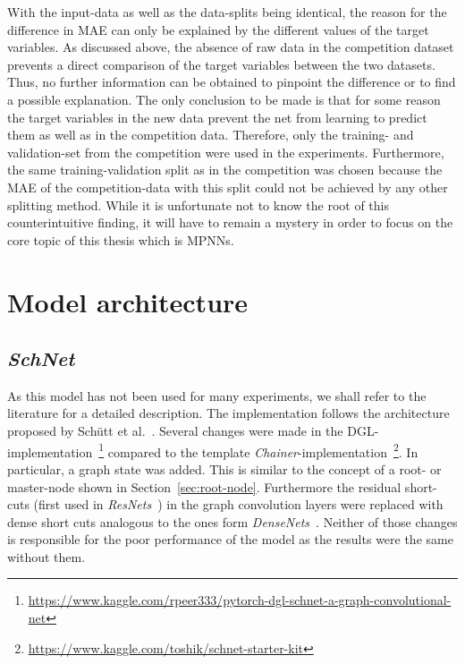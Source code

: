 With the input-data as well as the data-splits being identical, the reason for the difference in MAE can only be explained by the different values of the target variables. As discussed above, the absence of raw data in the competition dataset prevents a direct comparison of the target variables between the two datasets. Thus, no further information can be obtained to pinpoint the difference or to find a possible explanation. The only conclusion to be made is that for some reason the target variables in the new data prevent the net from learning to predict them as well as in the competition data. Therefore, only the training- and validation-set from the competition were used in the experiments. Furthermore, the same training-validation split as in the competition was chosen because the MAE of the competition-data with this split could not be achieved by any other splitting method. While it is unfortunate not to know the root of this counterintuitive finding, it will have to remain a mystery in order to focus on the core topic of this thesis which is MPNNs. 


\section{Model architecture}
\label{sec:architecture}

\subsection{\textit{SchNet}}
\label{sec:schnet-architecture}

As this model has not been used for many experiments, we shall refer to the literature for a detailed description. The implementation follows the architecture proposed by Schütt et al.~\cite{Schutt2017}. Several changes were made in the DGL-implementation~\footnote{\url{https://www.kaggle.com/rpeer333/pytorch-dgl-schnet-a-graph-convolutional-net}} compared to the template \textit{Chainer}-implementation~\footnote{\url{https://www.kaggle.com/toshik/schnet-starter-kit}}. In particular, a graph state was added. This is similar to the concept of a root- or master-node shown in Section~\ref{sec:root-node}. Furthermore the residual short-cuts (first used in \textit{ResNets}~\cite{Sun2016}) in the graph convolution layers were replaced with dense short cuts analogous to the ones form \textit{DenseNets}~\cite{Huang2017}. Neither of those changes is responsible for the poor performance of the model as the results were the same without them.



